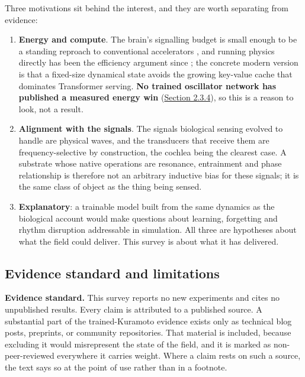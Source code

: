 \documentclass[10pt]{article}
\providecommand{\tightlist}{%
  \setlength{\itemsep}{0pt}\setlength{\parskip}{0pt}}
\begin{document}
Three motivations sit behind the interest, and they are worth separating
from evidence:

\begin{enumerate}
\def\labelenumi{\arabic{enumi}.}
\tightlist
\item
  \textbf{Energy and compute}. The brain's signalling budget is small
  enough to be a standing reproach to conventional accelerators
  \citep{attwell2001}, and running physics directly has been the
  efficiency argument since \citet{mead1990}; the concrete modern
  version is that a fixed-size dynamical state avoids the growing
  key-value cache that dominates Transformer serving. \textbf{No trained
  oscillator network has published a measured energy win}
  (\hyperref[sec-2-3-4]{Section 2.3.4}), so this is a reason to look,
  not a result.
\item
  \textbf{Alignment with the signals}. The signals biological sensing
  evolved to handle are physical waves, and the transducers that receive
  them are frequency-selective by construction, the cochlea being the
  clearest case. A substrate whose native operations are resonance,
  entrainment and phase relationship is therefore not an arbitrary
  inductive bias for these signals; it is the same class of object as
  the thing being sensed.
\item
  \textbf{Explanatory}: a trainable model built from the same dynamics
  as the biological account would make questions about learning,
  forgetting and rhythm disruption addressable in simulation. All three
  are hypotheses about what the field could deliver. This survey is
  about what it has delivered.
\end{enumerate}

\subsection{Evidence standard and limitations}\label{sec-1-5}

\textbf{Evidence standard.} This survey reports no new experiments and
cites no unpublished results. Every claim is attributed to a published
source. A substantial part of the trained-Kuramoto evidence exists only
as technical blog posts, preprints, or community repositories. That
material is included, because excluding it would misrepresent the state
of the field, and it is marked as non-peer-reviewed everywhere it
carries weight. Where a claim rests on such a source, the text says so
at the point of use rather than in a footnote.
\end{document}
